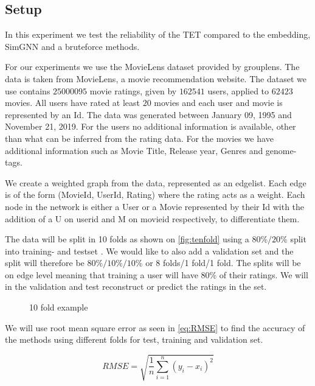 \subsection{Setup}
In this experiment we test the reliability of the TET compared to the embedding, SimGNN and a bruteforce methods. 

For our experiments we use the MovieLens dataset provided by grouplens\cite{Grouplensdata}. The data is taken from MovieLens, a movie recommendation website. The dataset we use contains $25000095$ movie ratings, given by $162541$ users, applied to $62423$ movies. All users have rated at least $20$ movies and each user and movie is represented by an Id. The data was generated between January 09, 1995 and November 21, 2019. For the users no additional information is available, other than what can be inferred from the rating data. For the movies we have additional information such as Movie Title, Release year, Genres and genome-tags.



We create a weighted graph from the data, represented as an edgelist. Each edge is of the form (MovieId, UserId, Rating) where the rating acts as a weight. Each node in the network is either a User or a Movie represented by their Id with the addition of a U on userid and M on movieid respectively, to differentiate them.

The data will be split in 10 folds as shown on \autoref{fig:tenfold} using a $80\%/20\%$ split into training- and testset \cite{Ricci2015}. We would like to also add a validation set and the split will therefore be $80\%/10\%/10\%$ or 8 folds/1 fold/1 fold. The splits will be on edge level meaning that training a user will have $80\%$ of their ratings. We will in the validation and test reconstruct or predict the ratings in the set.

\begin{figure}[H]
	\centering
	\begin{adjustbox}{width=0.5\textwidth}
		
	\end{adjustbox}
	\caption{10 fold example}
	\label{fig:tenfold}
\end{figure}

We will use root mean square error as seen in \autoref{eq:RMSE}\cite{chai2014root} to find the accuracy of the methods using different folds for test, training  and validation set.

\begin{equation}\label{eq:RMSE}
RMSE = \sqrt{\frac{1}{n}\sum^n_{i=1}(y_i - x_i)^2}
\end{equation}

